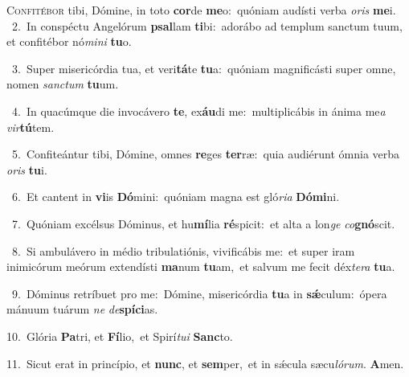 \lettrine{\initial\textcolor{\initialcolor}{C}}{onfitébor} tibi, Dómine, in toto \textbf{cor}\-de \textbf{me}\-o:~\star quóniam audísti verba \textit{o}\-\textit{ris} \textbf{me}\-i.\\
{\numbfont\textcolor{\numbcolor}{~2.}}~In conspéctu Angelórum \textbf{psal}\-lam \textbf{ti}\-bi:~\star adorábo ad templum sanctum tuum, et confitébor nó\-\textit{mi}\-\textit{ni} \textbf{tu}\-o.\par
{\numbfont\textcolor{\numbcolor}{~3.}}~Super misericórdia tua, et veri\-\textbf{tá}\-te \textbf{tu}\-a:~\star quóniam magnificásti super omne, nomen \textit{sanc}\-\textit{tum} \textbf{tu}\-um.\par
{\numbfont\textcolor{\numbcolor}{~4.}}~In quacúmque die invocávero \textbf{te}\-, ex\-\textbf{áu}\-di me:~\star multiplicábis in ánima me\textit{a} \textit{vir}\-\textbf{tú}tem.\par
{\numbfont\textcolor{\numbcolor}{~5.}}~Confiteántur tibi, Dómine, omnes \textbf{re}\-ges \textbf{ter}\-ræ:~\star quia audiérunt ómnia verba \textit{o}\-\textit{ris} \textbf{tu}\-i.\par
{\numbfont\textcolor{\numbcolor}{~6.}}~Et cantent in \textbf{vi}\-is \textbf{Dó}\-mini:~\star quóniam magna est gló\-\textit{ri}\-\textit{a} \textbf{Dó}\-\textbf{mi}ni.\par
{\numbfont\textcolor{\numbcolor}{~7.}}~Quóniam excélsus Dóminus, et hu\-\textbf{mí}\-lia \textbf{ré}\-spicit:~\star et alta a lon\textit{ge} \textit{co}\-\textbf{gnó}scit.\par
{\numbfont\textcolor{\numbcolor}{~8.}}~Si ambulávero in médio tribulatiónis, vivificábis me:~\dagger et super iram inimicórum meórum extendísti \textbf{ma}\-num \textbf{tu}\-am,~\star et salvum me fecit déx\-\textit{te}\-\textit{ra} \textbf{tu}\-a.\par
{\numbfont\textcolor{\numbcolor}{~9.}}~Dóminus retríbuet pro me:~\dagger Dómine, misericórdia \textbf{tu}\-a in \textbf{sǽ}\-culum:~\star ópera mánuum tuárum \textit{ne} \textit{de}\-\textbf{spí}\textbf{ci}as.\par
{\numbfont\textcolor{\numbcolor}{10.}}~Glória \textbf{Pa}\-tri, et \textbf{Fí}\-lio,~\star et Spirí\-\textit{tu}\-\textit{i} \textbf{Sanc}\-to.\par
{\numbfont\textcolor{\numbcolor}{11.}}~Sicut erat in princípio, et \textbf{nunc}\-, et \textbf{sem}\-per,~\star et in sǽcula sæcu\-\textit{ló}\-\textit{rum}. \textbf{A}\-men.\par
